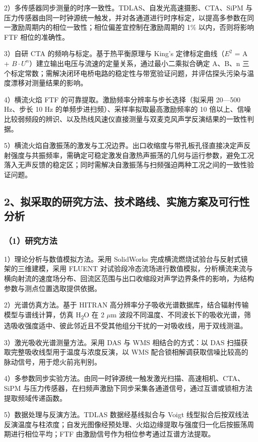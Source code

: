 \documentclass[UTF8,a4paper,zihao=-4,fontset=windows]{ctexart}
\begin{document}
2）多传感器同步测量的时序一致性。TDLAS、自发光高速摄影、CTA、SiPM 与压力传感器由同一时钟源统一触发，并对各通道进行时序标定，以提高多参数在同一激励周期内的相位一致性；相位偏差宜控制在激励周期的 1\% 以内，否则将影响 FTF 相位的准确性。

3）自研 CTA 的频响与标定。基于热平衡原理与 \mbox{King's} 定律标定曲线（$E^{2}$ = A + $B\cdot U^{n}$）建立输出电压与流速的定量关系，通过最小二乘拟合确定 A、B、n 三个标定常数；需解决闭环电桥电路的稳定性与带宽验证问题，并评估探头污染与温度漂移对测量结果的影响。

4）横流火焰 FTF 的可靠提取。激励频率分辨率与步长选择（拟采用 20—500 Hz、步长 10 Hz 的单频步进扫频）、采样率拟取最高激励频率的 10 倍以上、信噪比较弱频段的辨识、以及热线风速仪直接测量与双麦克风声学反演结果的一致性判据。

5）横流火焰自激振荡的激发与工况边界。出口收缩度与带孔板孔径直接决定声反射强度与共振频率，需确定可稳定激发自激热声振荡的几何与运行参数，避免工况落入无声反馈的稳定区；同时需解决自激振荡与扫频强迫两种工况之间的一致性验证问题。

\subsection{2、拟采取的研究方法、技术路线、实施方案及可行性分析}
\subsubsection{（1）研究方法}
1）理论分析与数值模拟方法。采用 SolidWorks 完成横流燃烧试验台与反射式镜架的三维建模，采用 FLUENT 对试验段冷态流场进行数值模拟，分析横流来流与横向射流的速度场分布、回流区范围与出口收缩段对声学边界条件的影响，为结构参数与测点位置选取提供依据。

2）光谱仿真方法。基于 HITRAN 高分辨率分子吸收光谱数据库，结合辐射传输模型与谱线计算，仿真 H\textsubscript{2}O 在 2 $\mu$m 波段不同温度、不同波长下的吸收光谱，筛选吸收强度适中、彼此邻近且不受其他组分干扰的一对吸收线，用于双线测温。

3）激光吸收光谱测量方法。采用 DAS 与 WMS 相结合的方式：以 DAS 扫描获取完整吸收线型用于温度与浓度反演，以 WMS 配合锁相解调获取信噪比较高的脉动信号，用于熄火前兆判别。

4）多参数同步实验方法。由同一时钟源统一触发激光扫描、高速相机、CTA、SiPM 与压力传感器，在扫频声激励下同步采集各通道信号，通过互谱或锁相方法提取频域传递函数。

5）数据处理与反演方法。TDLAS 数据经基线拟合与 Voigt 线型拟合后按双线法反演温度与柱浓度；自发光图像经预处理、火焰边缘提取与强度归一化后按振荡周期进行相位平均；FTF 由激励信号作为相位参考通过互谱方法提取。
\end{document}
